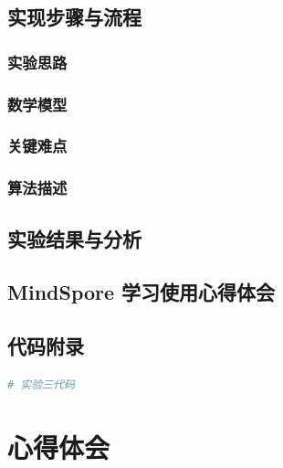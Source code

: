 \documentclass[12pt]{article}
\begin{document}
\subsection{实现步骤与流程}
\subsubsection{实验思路}


\subsubsection{数学模型}


\subsubsection{关键难点}


\subsubsection{算法描述}


\subsection{实验结果与分析}

\subsection{MindSpore 学习使用心得体会}

\subsection{代码附录}



\begin{lstlisting}[language=Python]
# 实验三代码
\end{lstlisting}

\newpage
\section{\centering 心得体会}
\end{document}
